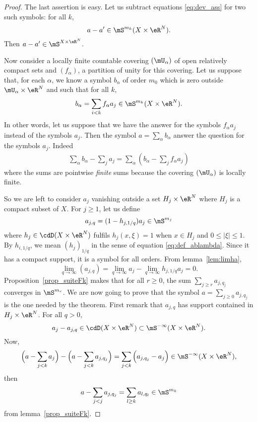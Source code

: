 \begin{proof}
	The last assertion is easy. Let us subtract equations \eqref{eq:dev_ass} for two such symbols: for all $k$,
	\[
		a-a'\in\mS^{m_k}(X\times\eR^N).
	\]
	Then $a-a'\in\mS^{X\times\eR^N}$.

	Now consider a locally finite countable covering $(\mU_{\alpha})$ of open relatively compact sets and $(f_{\alpha})$, a partition of unity for this covering. Let us suppose that, for each $\alpha$, we know a symbol $b_{\alpha}$ of order $m_0$ which is zero outside $\mU_{\alpha}\times\eR^N$ and such that for all $k$,
	\[
		b_{\alpha}=\sum_{i<k}f_{\alpha}a_j\in\mS^{m_k}(X\times\eR^N).
	\]
	In other words, let us suppose that we have the answer for the symbols $f_{\alpha}a_j$ instead of the symbols $a_j$. Then the symbol $a=\sum_{\alpha}b_{\alpha}$ answer the question for the symbols $a_j$. Indeed
	\begin{equation}
		\begin{split}
			\sum_{\alpha}b_{\alpha}-\sum_ja_j=\sum_{\alpha}(b_{\alpha}-\sum_jf_{\alpha}a_j)
		\end{split}
	\end{equation}
	where the sums are pointwise \emph{finite} sums because the covering $(\mU_{\alpha})$ is locally finite.

	So we are left to consider $a_j$ vanishing outside a set $H_j\times\eR^N$ where $H_j$ is a compact subset of $X$. For $j\geq 1$, let us define
	\begin{equation}
		a_{j,q}=(1-h_{j,1/q})a_j\in\mS^{m_j}
	\end{equation}
	where $h_j\in\cdD(X\times\eR^N)$ fulfils $h_j(x,\xi)=1$ when $x\in H_j$ and $0\leq|\xi|\leq 1$. By $h_{i,1/q}$, we mean $(h_j)_{1/q}$ in the sense of equation \eqref{eq:def_ablambda}. Since it has a compact support, it is a symbol for all orders. From lemma~\ref{lem:limha},
	\[
		\lim_{q\to\infty}(a_{j,q})=\lim_{q\to\infty}a_j-\lim_{q\to\infty}h_{j,1/q}a_j=0.
	\]
	Proposition~\ref{prop_suiteFk} makes that for all $r\geq 0$, the sum $\sum_{j\geq r}a_{j,q_j}$ converges in $\mS^{m_r}$. We are now going to prove that the symbol $a=\sum_{j\geq 0}a_{j,q_j}$ is the one needed by the theorem. First remark that $a_{j,q}$ has support contained in $H_j\times\eR^N$. For all $q>0$,
	\[
		a_j-a_{j,q}\in\cdD(X\times\eR^N)\subset\mS^{-\infty}(X\times\eR^N).
	\]
	Now,
	\[
		\Big( a-\sum_{j<k}a_j \Big)-\Big( a-\sum_{j<k}a_{j,q_j} \Big)=\sum_{j<k}\Big( a_{j,q_j}-a_j \Big)\in\mS^{-\infty}(X\times\eR^N),
	\]
	then
	\[
		a-\sum_{j<j}a_{j,q_j}=\sum_{l\geq k}a_{l,q_l}\in\mS^{m_k}
	\]
	from lemma~\ref{prop_suiteFk}.

\end{proof}

